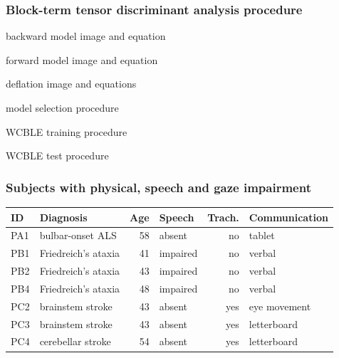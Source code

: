 \documentclass{kul-ulille-beamer}
\begin{document}
\begin{frame}[noframenumbering]

  \frametitle{Block-term tensor discriminant analysis procedure}
  backward model image and equation

  forward model image and equation

  deflation image and equations

  model selection procedure
\end{frame}

\begin{frame}[noframenumbering]
 WCBLE training procedure
\end{frame}

\begin{frame}[noframenumbering]
  WCBLE test procedure
\end{frame}

\begin{frame}[noframenumbering]
  \frametitle{Subjects with physical, speech and gaze impairment}

  \begin{tabular}{@{}l|lrlrl@{}}
      \textbf{ID}  & \textbf{Diagnosis} & \textbf{Age} &
      \textbf{Speech} & \textbf{Trach.} & \textbf{Communication} \\ \hline
      PA1 & bulbar-onset ALS & 58  & absent  & no          & tablet                 \\
      PB1 & Friedreich's ataxia & 41  & impaired & no          & verbal                 \\
      PB2 & Friedreich's ataxia & 43  & impaired & no          & verbal                 \\
      PB4 & Friedreich's ataxia & 48  & impaired & no          & verbal                 \\
      PC2 & brainstem stroke & 43  & absent  & yes         &  eye movement \\
      PC3 & brainstem stroke & 43  & absent  & yes         & letterboard            \\
      PC4 & cerebellar stroke & 54  & absent  & yes         & letterboard \\
  \end{tabular}

\end{frame}
\end{document}
